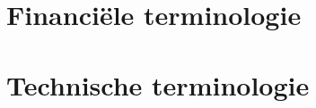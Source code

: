 %
%

\label{chap:woordenboek}


%
%

\section{Financi\"ele terminologie}


%
%

\section{Technische terminologie}

